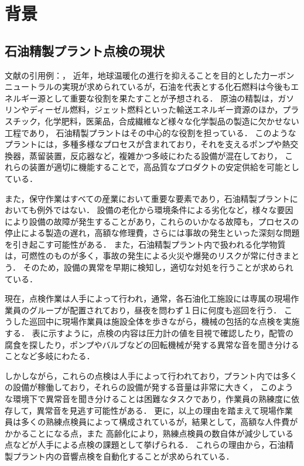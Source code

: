 \documentclass[../main]{subfiles}
\begin{document}

\section{背景}
\subsection{石油精製プラント点検の現状}
\label{sec:intro_background}
文献の引用例：\cite{cao2014main1-1-4-3}，\cite{Kiribayashi2018}
近年，地球温暖化の進行を抑えることを目的とした力ーボンニュートラルの実現が求められているが，石油を代表とする化石燃料は今後もエネルギー源として重要な役割を果たすことが予想される．
原油の精製は，ガソリンやディーゼル燃料，ジェット燃料といった輸送エネルギー資源のほか，プラスチック，化学肥料，医薬品，合成繊維など様々な化学製品の製造に欠かせない工程であり，
石油精製プラントはその中心的な役割を担っている．
このようなプラントには，多種多様なプロセスが含まれており，それを支えるポンプや熱交換器，蒸留装置，反応器など，複雑かつ多岐にわたる設備が混在しており，
これらの装置が適切に機能することで，高品質なプロダクトの安定供給を可能としている．

また，保守作業はすべての産業において重要な要素であり，石油精製プラントにおいても例外ではない．
設備の老化から環境条件による劣化など，様々な要因により設備の故障が発生することがあり，これらのいかなる故障も，プロセスの停止による製造の遅れ，高額な修理費，さらには事故の発生といった深刻な問題を引き起こす可能性がある．
また，石油精製プラント内で扱われる化学物質は，可燃性のものが多く，事故の発生による火災や爆発のリスクが常に付きまとう．
そのため，設備の異常を早期に検知し，適切な対処を行うことが求められている．

現在，点検作業は人手によって行われ，通常，各石油化工施設には専属の現場作業員のグループが配置されており，昼夜を問わず１日に何度も巡回を行う．
こうした巡回中に現場作業員は施設全体を歩きながら，機械の包括的な点検を実施する．
表に示すように，点検の内容は圧力計の値を目視で確認したり，配管の腐食を探したり，ポンプやバルブなどの回転機械が発する異常な音を聞き分けることなど多岐にわたる．

しかしながら，これらの点検は人手によって行われており，プラント内では多くの設備が稼働しており，それらの設備が発する音量は非常に大きく，
このような環境下で異常音を聞き分けることは困難なタスクであり，作業員の熟練度に依存して，異常音を見逃す可能性がある．
更に，以上の理由を踏まえて現場作業員は多くの熟練点検員によって構成されているが，結果として，高額な人件費がかかることになる点，また
高齢化により，熟練点検員の数自体が減少している点などが人手による点検の課題として挙げられる．
これらの理由から，石油精製プラント内の音響点検を自動化することが求められている．
\end{document}
